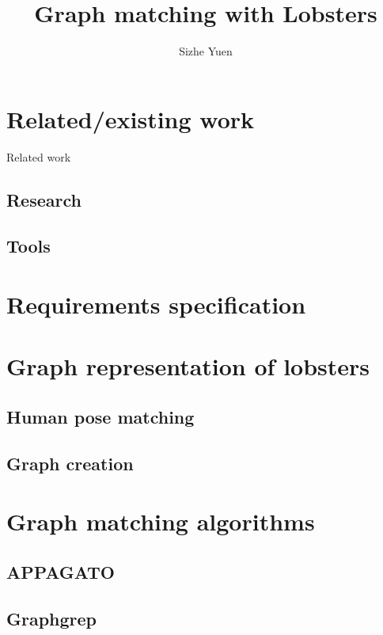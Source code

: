 \documentclass{article}
\title{Graph matching with Lobsters}
\author{Sizhe Yuen}
\begin{document}


\tableofcontents





\section{Related/existing work}
Related work \cite{appagato} \cite{graphgrep} \cite{gephi} \cite{human-pose} \cite{lobster-thesis}
\subsection{Research}

\subsection{Tools}

\section{Requirements specification}


\section{Graph representation of lobsters}

\subsection{Human pose matching}

\subsection{Graph creation}

\section{Graph matching algorithms}

\subsection{APPAGATO}

\subsection{Graphgrep}
\end{document}
